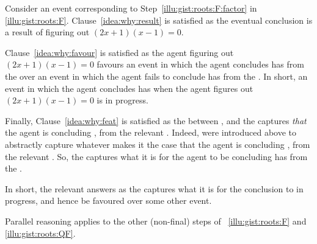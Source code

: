 \begin{note}
  Consider an event corresponding to Step~\ref{illu:gist:roots:F:factor} in \autoref{illu:gist:roots:F}.
  Clause~\ref{idea:why:result} is satisfied as the eventual conclusion is a result of figuring out \((2x + 1)(x - 1) = 0\).

  Clause~\ref{idea:why:favour} is satisfied as the agent figuring out \((2x + 1)(x - 1) = 0\) favours an event in which the agent concludes \propI{\rootsCon{}} has   from the \pool{} over an event in which the agent fails to conclude \propI{\rootsCon{}} has   from the \pool{}.
  In short, an event in which the agent concludes \propI{\rootsCon{}} has   when the agent figures out \((2x + 1)(x - 1) = 0\) is in progress.

  Finally, Clause~\ref{idea:why:feat} is satisfied as the \ros{} between \propI{\rootsCon{}},  and the \pool{} captures \emph{that} the agent is concluding \propM{\rootsCon{}},  from the relevant \pool{}.
  Indeed,  were introduced above to abstractly capture whatever makes it the case that the agent is concluding \propM{\rootsCon{}},  from the relevant \pool{}.
  So, the \ros{} captures what it is for the agent to be concluding \propI{\rootsCon{}} has   from the \pool{}.
\end{note}


\begin{note}
  In short, the relevant  answers \qWhy{} as the \ros{} captures what it is for the conclusion to in progress, and hence be favoured over some other event.

  Parallel reasoning applies to the other (non-final) steps of ~\ref{illu:gist:roots:F} and \ref{illu:gist:roots:QF}.
\end{note}


